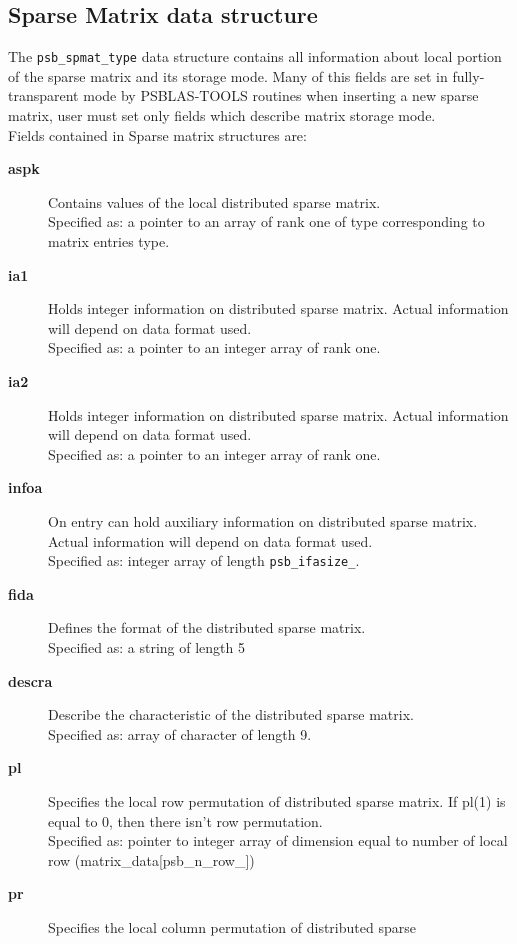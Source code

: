\subsection{Sparse Matrix data structure}
\label{sec:spmat}
The \hypertarget{spdata}{{\tt psb\_spmat\_type}} data structure
contains all information about local portion of the sparse matrix and   
its storage mode. Many of this fields are set in fully-transparent
mode by PSBLAS-TOOLS routines when inserting a new sparse matrix, user
must set only fields which describe matrix storage mode. \\
Fields contained in Sparse matrix structures are:
\begin{description}
\item[{\bf aspk}] Contains values of the local distributed sparse
matrix.\\
Specified as: a pointer to an array of rank one of type corresponding
to matrix entries type.
\item[{\bf ia1}] Holds integer information on distributed sparse
matrix. Actual information will depend on data format used.\\
Specified as: a pointer to an integer array of rank one.
\item[{\bf ia2}] Holds integer information on distributed sparse
matrix. Actual information will depend on data format used.\\
Specified as: a pointer to an integer array of rank one.
\item[{\bf infoa}] On entry can hold auxiliary information on distributed sparse
matrix.  Actual information will depend on data format used.\\
Specified as: integer array of length \verb|psb_ifasize_|.
\item[{\bf fida}] Defines the format of the distributed sparse matrix.\\
Specified as: a string of length 5
\item[{\bf descra}] Describe the characteristic of the distributed sparse matrix.\\
Specified as: array of character of length 9.
\item[{\bf pl}] Specifies the local row permutation of distributed sparse
matrix. If pl(1) is equal to 0, then there isn't row permutation.\\
Specified as: pointer to integer array of dimension equal to number of local row (matrix\_data[psb\_n\_row\_\hbox{]})
\item[{\bf pr}] Specifies the local column permutation of distributed sparse

\end{description}
